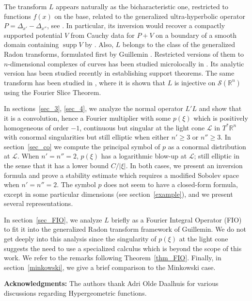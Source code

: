\documentclass[11pt]{amsart}
\theoremstyle{definition}
\theoremstyle{remark}
\numberwithin{equation}{section}
\newcommand{\rb}{\mathbb{R}}
\DeclareMathOperator{\supp}{supp}
\begin{document}
The transform $L$ appears naturally as the bicharacteristic one, restricted to functions $f(x)$ on the base, related to the generalized ultra-hyperbolic operator $P=\Delta_{x'}-\Delta_{x''}$, see \cite{OSSU-principal}. In particular, its inversion would recover a compactly supported potential $V$ from Cauchy data for $P+V$ on a boundary of a smooth domain containing $\supp V$ by \cite[Theorem~1.2]{OSSU-principal}.  
Also, $L$ belongs to the class of the generalized Radon transforms, formulated first by Guillemin \cite{Guillemin85,GuilleminS}. Restricted versions of them to $n$-dimensional complexes of curves has been studied microlocally in \cite{Greenleaf_Uhlmann90,Greenleaf_UhlmannCM,Greenleaf-Uhlmann}. Its analytic version has been studied recently in \cite{mazzucchelli2023Analytic} establishing support theorems. The same transform has been studied in \cite{Ilmavirta-pseudo}, where it is shown that $L$ is injective on $\mathcal{S}(\rb^n)$ using the Fourier Slice Theorem. 

In sections~\ref{sec_3}, \ref{sec_4}, we analyze the normal operator $L'L$ and show that it is a convolution, hence a Fourier multiplier with some $p(\xi)$ which is positively homogeneous of order $-1$, continuous but singular at the light cone $\mathcal{L}$ in $T^*\rb^n$ with conormal singularities but still elliptic when either $n'\ge3$ or $n''\ge3$. In section~\ref{sec_co} we  compute the principal symbol of $p$ as a conormal distribution at $\mathcal{L}$.  When $n'=n''=2$, $p(\xi)$ has a logarithmic blow-up at   $\mathcal L$; still elliptic in the sense that it has a lower bound $C/|\xi|$. In both cases, we present an inversion formula and prove a stability estimate which requires a modified Sobolev space when $n'=n''=2$.  The symbol $p$ does not seem to have a closed-form formula, except in some particular dimensions (see section~\ref{example}), and we present several representations. 

In section~\ref{sec_FIO}, we analyze $L$ briefly as a Fourier Integral Operator (FIO) to fit it into the generalized Radon transform framework of Guillemin. We do not get deeply into this analysis since the singularity of $p(\xi)$ at the light cone suggests the need to use a specialized calculus which is beyond the scope of this work. We refer to the remarks following Theorem~\ref{thm_FIO}. Finally, in section~\ref{minkowski}, we give a brief comparison to the Minkowski case.

\textbf{Acknowledgments:} The authors thank Adri Olde Daalhuis for various discussions regarding Hypergeometric functions. 
\end{document}
